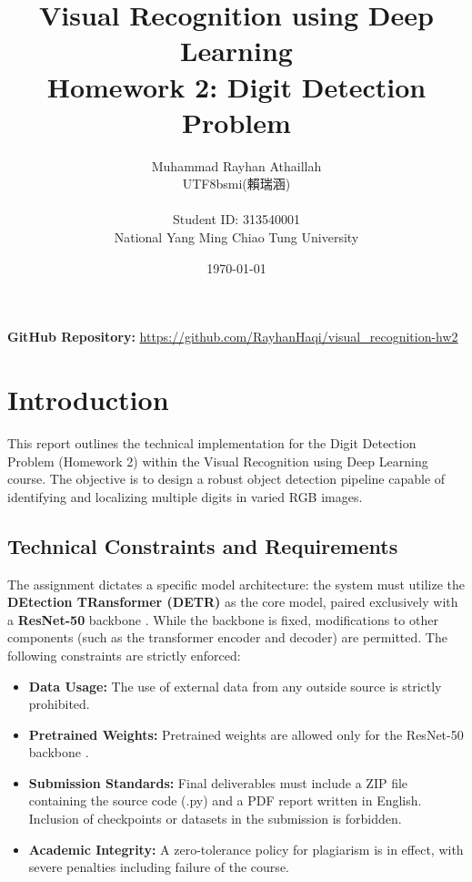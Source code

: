 \documentclass[12pt, a4paper]{article}
\title{\textbf{Visual Recognition using Deep Learning}\\ \large Homework 2: Digit Detection Problem}
\author{
    Muhammad Rayhan Athaillah \begin{CJK*}{UTF8}{bsmi}(賴瑞涵)\end{CJK*}\\ 
    \small Student ID: 313540001\\ 
    \small National Yang Ming Chiao Tung University
}
\date{\today}
\begin{document}
\maketitle

\vspace{0.5cm}
\noindent \textbf{GitHub Repository:} \href{https://github.com/RayhanHaqi/visual\_recognition-hw2}{https://github.com/RayhanHaqi/visual\_recognition-hw2}

\section{Introduction}
This report outlines the technical implementation for the Digit Detection Problem (Homework 2) within the Visual Recognition using Deep Learning course. The objective is to design a robust object detection pipeline capable of identifying and localizing multiple digits in varied RGB images. 

\subsection{Technical Constraints and Requirements}
The assignment dictates a specific model architecture: the system must utilize the \textbf{DEtection TRansformer (DETR)} as the core model, paired exclusively with a \textbf{ResNet-50} backbone \cite{he2016}. While the backbone is fixed, modifications to other components (such as the transformer encoder and decoder) are permitted. The following constraints are strictly enforced:
\begin{itemize}
    \item \textbf{Data Usage:} The use of external data from any outside source is strictly prohibited.
    \item \textbf{Pretrained Weights:} Pretrained weights are allowed only for the ResNet-50 backbone \cite{he2016}.
    \item \textbf{Submission Standards:} Final deliverables must include a ZIP file containing the source code (.py) and a PDF report written in English. Inclusion of checkpoints or datasets in the submission is forbidden.
    \item \textbf{Academic Integrity:} A zero-tolerance policy for plagiarism is in effect, with severe penalties including failure of the course.
\end{itemize}

\end{document}
